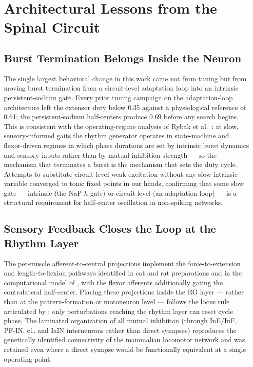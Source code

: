 \section{Architectural Lessons from the Spinal Circuit}
\label{sec:disc-cpg}

\subsection{Burst Termination Belongs Inside the Neuron}

The single largest behavioral change in this work came not from tuning
but from moving burst termination from a circuit-level adaptation loop
into an intrinsic persistent-sodium gate. Every prior tuning campaign
on the adaptation-loop architecture left the extensor duty below 0.35
against a physiological reference of 0.61; the persistent-sodium
half-centers produce 0.69 before any search begins. This is
consistent with the operating-regime analysis of Rybak et
al.~\citep{rybak2024, rybak2025}: at slow, sensory-informed gaits the
rhythm generator operates in state-machine and flexor-driven regimes
in which phase durations are set by intrinsic burst dynamics and
sensory inputs rather than by mutual-inhibition strength — so the
mechanism that terminates a burst is the mechanism that sets the duty
cycle. Attempts to substitute circuit-level weak excitation without
any slow intrinsic variable converged to tonic fixed points in our
hands, confirming that some slow gate — intrinsic (the NaP $h$-gate)
or circuit-level (an adaptation loop) — is a structural requirement
for half-center oscillation in non-spiking networks.

\subsection{Sensory Feedback Closes the Loop at the Rhythm Layer}

The per-muscle afferent-to-central projections implement the
force-to-extension and length-to-flexion pathways identified in cat
and rat preparations \citep{gossard1994, conway1987, perreault2011,
dominguez2020} and in the computational model of \citet{rybak2025},
with the flexor afferents additionally gating the contralateral
half-center. Placing these projections inside the RG layer — rather
than at the pattern-formation or motoneuron level — follows the locus
rule articulated by \citet{rybak2015}: only perturbations reaching the
rhythm layer can reset cycle phase. The laminated organization of all
mutual inhibition (through InE/InF, PF-IN, c1, and IaIN interneurons
rather than direct synapses) reproduces the genetically identified
connectivity of the mammalian locomotor network
\citep{shevtsova2026, talpalar2013, zhang2022} and was retained even
where a direct synapse would be functionally equivalent at a single
operating point.

